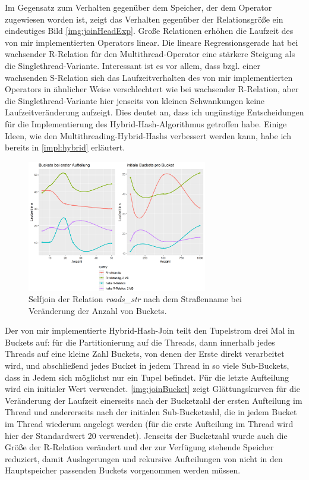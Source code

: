 \documentclass[a4paper,12pt,twoside]{article}
\newcommand{\Fb}[1]{\textit{#1}} %
\begin{document}
Im Gegensatz zum Verhalten gegenüber dem Speicher, der dem Operator zugewiesen worden ist, zeigt das Verhalten gegenüber der Relationsgröße ein eindeutiges Bild \autoref{img:joinHeadExp}. Große Relationen erhöhen die Laufzeit des von mir implementierten Operators linear. Die lineare Regressionsgerade hat bei wachsender R-Relation für den Multithread-Operator eine stärkere Steigung als die Singlethread-Variante. Interessant ist es vor allem, dass bzgl. einer wachsenden S-Relation sich das Laufzeitverhalten des von mir implementierten Operators in ähnlicher Weise verschlechtert wie bei wachsender R-Relation, aber die Singlethread-Variante hier jenseits von kleinen Schwankungen keine Laufzeitveränderung aufzeigt. Dies deutet an, dass ich ungünstige Entscheidungen für die Implementierung des Hybrid-Hash-Algorithmus getroffen habe. Einige Ideen, wie den Multithreading-Hybrid-Hashs verbessert werden kann, habe ich bereits in \autoref{impl:hybrid} erläutert.   

\begin{figure}
	\centering
	\includegraphics[width=0.70\textwidth]{Bilder/join_bucket.png}
	\caption{Selfjoin der Relation \Fb{roads\_str} nach dem Straßenname bei Veränderung der Anzahl von Buckets.}
	\label{img:joinBucket}
\end{figure}

Der von mir implementierte Hybrid-Hash-Join teilt den Tupelstrom drei Mal in Buckets auf: für die Partitionierung auf die Threads, dann innerhalb jedes Threads auf eine kleine Zahl Buckets, von denen der Erste direkt verarbeitet wird, und abschließend jedes Bucket in jedem Thread in so viele Sub-Buckets, dass in Jedem sich möglichst nur ein Tupel befindet. Für die letzte Aufteilung wird ein initialer Wert verwendet. \autoref{img:joinBucket} zeigt Glättungskurven für die Veränderung der Laufzeit einerseits nach der Bucketzahl der ersten Aufteilung im Thread und andererseits nach der initialen Sub-Bucketzahl, die in jedem Bucket im Thread wiederum angelegt werden (für die erste Aufteilung im Thread wird hier der Standardwert 20 verwendet). Jenseits der Bucketzahl wurde auch die Größe der R-Relation verändert und der zur Verfügung stehende Speicher reduziert, damit Auslagerungen und rekursive Aufteilungen von nicht in den Hauptspeicher passenden Buckets vorgenommen werden müssen.
\end{document}
